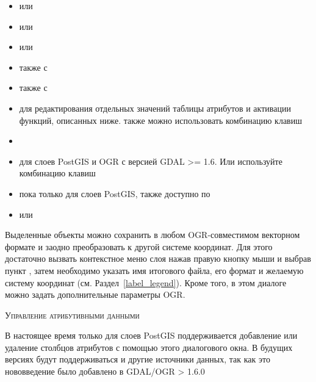 \begin{itemize}[label=--]
\item {} или 
\item {} или 
\item {} или 
\item {}
также с 
\item {}
также с 
\item {} для
редактирования отдельных значений таблицы атрибутов и активации функций,
описанных ниже. также можно использовать комбинацию клавиш 
\item {} 
\item {} для слоев PostGIS
и OGR с версией GDAL >= 1.6. Или используйте комбинацию клавиш 
\item {} пока только для
слоев PostGIS, также доступно по 
\item {} или
\end{itemize}


Выделенные объекты можно сохранить в любом OGR-совместимом векторном формате
и заодно преобразовать к другой системе координат. Для этого достаточно
вызвать контекстное меню слоя нажав правую кнопку мыши и выбрав пункт
, затем необходимо указать имя
итогового файла, его формат и желаемую систему координат (см. Раздел~\ref{label_legend}).
Кроме того, в этом диалоге можно задать дополнительные параметры OGR.


\begin{Tip}\caption{\textsc{Управление атрибутивными данными}}
В настоящее время только для слоев PostGIS поддерживается добавление или
удаление столбцов атрибутов с помощью этого диалогового окна. В
будущих версиях \qg будут поддерживаться и другие источники данных,
так как это нововведение было добавлено в GDAL/OGR > 1.6.0
\end{Tip}


